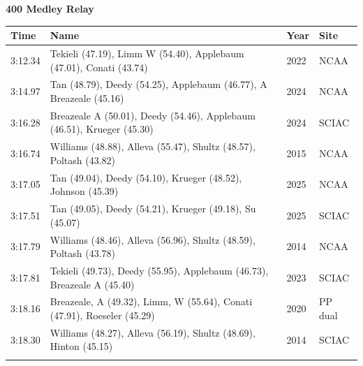 \noindent\begin{minipage}[t]{0.98\textwidth}
\centering
\textbf{\textcolor{teamprimary}{400 Medley Relay}}\par
\vspace{0.5em}
\centering
\small
\renewcommand{\arraystretch}{1.0}
\setlength{\tabcolsep}{4pt}
\begin{tabular}{@{}p{2.7cm}p{4.3cm}p{1.6cm}p{2.7cm}@{}}
\toprule
\textbf{Time} & \textbf{Name} & \textbf{Year} & \textbf{Site} \\
\midrule
3:12.34 & Tekieli (47.19), Limm W (54.40), Applebaum (47.01), Conati (43.74) & 2022 & NCAA \\
3:14.97 & Tan (48.79), Deedy (54.25), Applebaum (46.77), A Breazeale (45.16) & 2024 & NCAA \\
3:16.28 & Breazeale A (50.01), Deedy (54.46), Applebaum (46.51), Krueger (45.30) & 2024 & SCIAC \\
3:16.74 & Williams (48.88), Alleva (55.47), Shultz (48.57), Poltash (43.82) & 2015 & NCAA \\
3:17.05 & Tan (49.04), Deedy (54.10), Krueger (48.52), Johnson (45.39) & 2025 & NCAA \\
3:17.51 & Tan (49.05), Deedy (54.21), Krueger (49.18), Su (45.07) & 2025 & SCIAC \\
3:17.79 & Williams (48.46), Alleva (56.96), Shultz (48.59), Poltash (43.78) & 2014 & NCAA \\
3:17.81 & Tekieli (49.73), Deedy (55.95), Applebaum (46.73), Breazeale A (45.40) & 2023 & SCIAC \\
3:18.16 & Breazeale, A (49.32), Limm, W (55.64), Conati (47.91), Roeseler (45.29) & 2020 & PP dual \\
3:18.30 & Williams (48.27), Alleva (56.19), Shultz (48.69), Hinton (45.15) & 2014 & SCIAC \\
\bottomrule
\vspace{0.5em}
\end{tabular}
\end{minipage}
